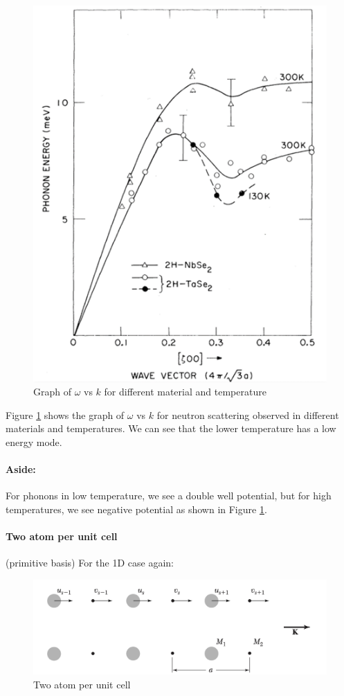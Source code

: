 \documentclass[../main.tex]{subfiles}
\begin{document}
\begin{figure}[ht]
    \centering
    \includegraphics[width=0.4\linewidth]{phonon2.png}
    \caption{Graph of $\omega$ vs $k$ for different material and temperature}
    \label{fig:5.2}
\end{figure}
Figure \ref{fig:5.2} shows the graph of $\omega$ vs $k$ for neutron scattering observed in different
materials and temperatures. We can see that the lower temperature has a low energy mode. 

\paragraph{Aside:} For phonons in low temperature, we see a double well potential, but for high
temperatures, we see negative potential as shown in Figure \ref{fig:5.2}. 

\paragraph{Two atom per unit cell} (primitive basis) For the 1D case again:
\begin{figure}[ht]
    \centering
    \includegraphics[width=0.8\linewidth]{2basis.png}
    \caption{Two atom per unit cell}
    \label{fig:5.3}
\end{figure}
\end{document}
